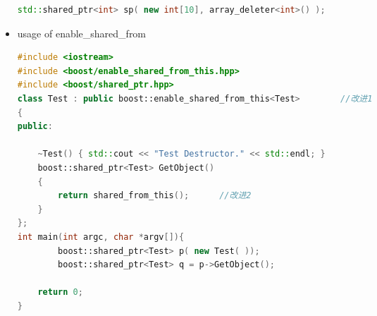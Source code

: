 \documentclass[a4paper,12pt,twoside]{book}
\begin{document}
\begin{itemize}
\begin{lstlisting}[frame=single, language=c++]
std::shared_ptr<int> sp( new int[10], array_deleter<int>() );
\end{lstlisting}

\item usage of enable\_shared\_from
\begin{lstlisting}[frame=single, language=c++]
#include <iostream>
#include <boost/enable_shared_from_this.hpp>
#include <boost/shared_ptr.hpp>
class Test : public boost::enable_shared_from_this<Test>        //改进1
{
public:
    
    ~Test() { std::cout << "Test Destructor." << std::endl; }
    boost::shared_ptr<Test> GetObject()
    {
        return shared_from_this();      //改进2
    }
};
int main(int argc, char *argv[]){
        boost::shared_ptr<Test> p( new Test( ));
        boost::shared_ptr<Test> q = p->GetObject();
    
    return 0;
}
\end{lstlisting}


\end{itemize}
\end{document}
